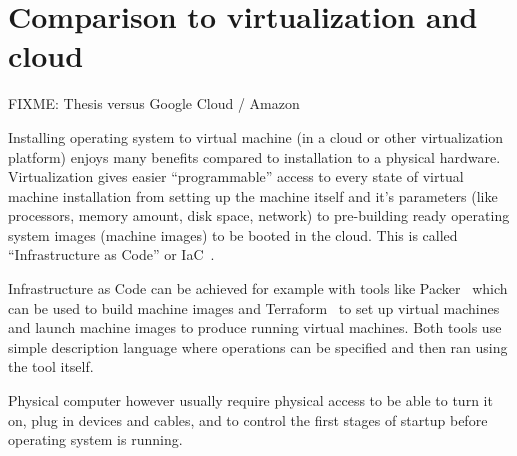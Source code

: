 \section{Comparison to virtualization and cloud}

FIXME: Thesis versus Google Cloud / Amazon

Installing operating system to virtual machine (in a cloud or other
virtualization platform) enjoys many benefits compared to installation
to a physical hardware. Virtualization gives easier ``programmable''
access to every state of virtual machine installation from setting up
the machine itself and it's parameters (like processors, memory
amount, disk space, network) to pre-building ready operating system
images (machine images) to be booted in the cloud. This is called
``Infrastructure as Code'' or IaC~\cite{spinellis}.

Infrastructure as Code can be achieved for example with tools like
Packer~\cite{packer} which can be used to build machine images and
Terraform~\cite{terraform} to set up virtual machines and launch
machine images to produce running virtual machines. Both tools use
simple description language where operations can be specified and then
ran using the tool itself.

Physical computer however usually require physical access to be able
to turn it on, plug in devices and cables, and to control the first
stages of startup before operating system is running.
